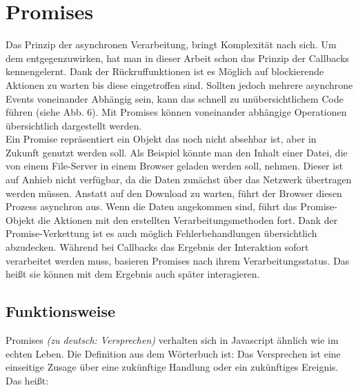 \section{Promises}

Das Prinzip der asynchronen Verarbeitung, bringt Komplexität nach sich. Um dem entgegenzuwirken, hat man in dieser Arbeit schon das Prinzip der Callbacks kennengelernt. Dank der Rückruffunktionen ist es Möglich auf blockierende Aktionen zu warten bis diese eingetroffen sind. Sollten jedoch mehrere asynchrone Events voneinander Abhängig sein, kann das schnell zu unübersichtlichem Code führen (siehe Abb. 6). Mit Promises können voneinander abhängige Operationen übersichtlich dargestellt werden.\\

\noindent
Ein Promise repräsentiert ein Objekt das noch nicht absehbar ist, aber in Zukunft genutzt werden soll. Als Beispiel könnte man den Inhalt einer Datei, die von einem File-Server in einem Browser geladen werden soll, nehmen. Dieser ist auf Anhieb nicht verfügbar, da die Daten zunächst über das Netzwerk übertragen werden müssen. Anstatt auf den Download zu warten, führt der Browser diesen Prozess asynchron aus. Wenn die Daten angekommen sind, führt das Promise-Objekt die Aktionen mit den erstellten Verarbeitungsmethoden fort. Dank der Promise-Verkettung ist es auch möglich Fehlerbehandlungen übersichtlich abzudecken. Während bei Callbacks das Ergebnis der Interaktion sofort verarbeitet werden muss, basieren Promises nach ihrem Verarbeitungsstatus. Das heißt sie können mit dem Ergebnis auch \glqq{}später\grqq{} interagieren.

\subsection{Funktionsweise}

\noindent
Promises \textit{(zu deutsch: Versprechen)} verhalten sich in Javascript ähnlich wie im echten Leben. Die Definition aus dem Wörterbuch ist: Das Versprechen ist eine einseitige Zusage über eine zukünftige Handlung oder ein zukünftiges Ereignis. \cite{versprechen} \\

\noindent
Das heißt:

